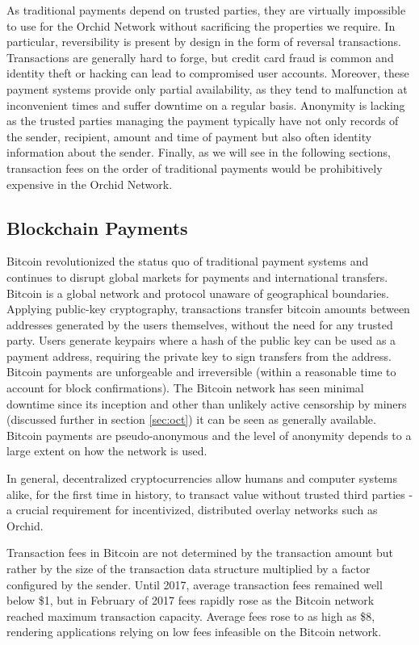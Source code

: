 As traditional payments depend on trusted parties, they are virtually impossible to use for the Orchid Network without sacrificing the properties we require. In particular, reversibility is present by design in the form of reversal transactions\cite{CardProcessing}. Transactions are generally hard to forge, but credit card fraud is common and identity theft or hacking can lead to compromised user accounts. Moreover, these payment systems provide only partial availability, as they tend to malfunction at inconvenient times and suffer downtime on a regular basis. Anonymity is lacking as the trusted parties managing the payment typically have not only records of the sender, recipient, amount and time of payment but also often identity information about the sender. Finally, as we will see in the following sections, transaction fees on the order of traditional payments would be prohibitively expensive in the Orchid Network.

\subsection{Blockchain Payments}

Bitcoin revolutionized the status quo of traditional payment systems and continues to disrupt global markets for payments and international transfers. Bitcoin is a global network and protocol unaware of geographical boundaries. Applying public-key cryptography, transactions transfer bitcoin amounts between addresses generated by the users themselves, without the need for any trusted party. Users generate keypairs where a hash of the public key can be used as a payment address, requiring the private key to sign transfers from the address\cite{BitcoinTxs}. Bitcoin payments are unforgeable and irreversible\cite{BitcoinReview} (within a reasonable time to account for block confirmations). The Bitcoin network has seen minimal downtime since its inception and other than unlikely active censorship by miners (discussed further in section \ref{sec:oct}) it can be seen as generally available. Bitcoin payments are pseudo-anonymous and the level of anonymity depends to a large extent on how the network is used\cite{BitcoinAnon}.

In general, decentralized cryptocurrencies allow humans and computer systems alike, for the first time in history, to transact value without trusted third parties - a crucial requirement for incentivized, distributed overlay networks such as Orchid.

Transaction fees in Bitcoin are not determined by the transaction amount but rather by the size of the transaction data structure multiplied by a factor configured by the sender. Until 2017, average transaction fees remained well below \$1, but in February of 2017 fees rapidly rose as the Bitcoin network reached maximum transaction capacity. Average fees rose\cite{BitInfoChartsBTC} to as high as \$8, rendering applications relying on low fees infeasible on the Bitcoin network.

